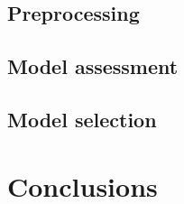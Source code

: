 \documentclass[10pt,twocolumn,letterpaper]{article}
\begin{document}
\subsection{Preprocessing}

\subsection{Model assessment}

\subsection{Model selection}

\section{Conclusions} \label{section:Con}


{\small


}
\end{document}
